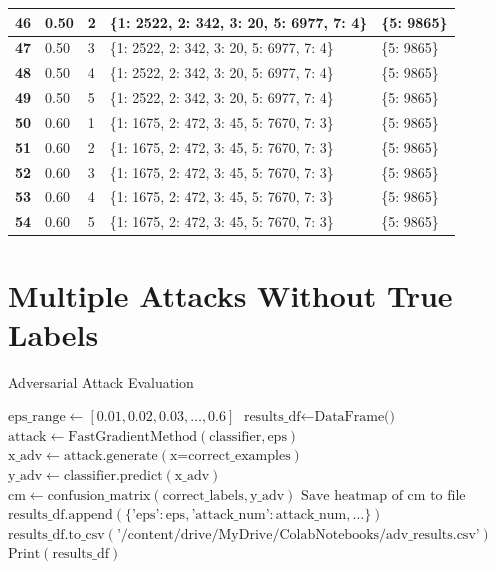 \documentclass[11pt,onside]{article}
\begin{document}
\begin{table}[]
\begin{tabular}{|l|l|l|l|l|}
\textbf{46} & 0.50         & 2            & \{1: 2522, 2: 342, 3: 20, 5: 6977, 7: 4\} & \{5: 9865\}              \\ \hline
\textbf{47} & 0.50         & 3            & \{1: 2522, 2: 342, 3: 20, 5: 6977, 7: 4\} & \{5: 9865\}              \\ \hline
\textbf{48} & 0.50         & 4            & \{1: 2522, 2: 342, 3: 20, 5: 6977, 7: 4\} & \{5: 9865\}              \\ \hline
\textbf{49} & 0.50         & 5            & \{1: 2522, 2: 342, 3: 20, 5: 6977, 7: 4\} & \{5: 9865\}              \\ \hline
\textbf{50} & 0.60         & 1            & \{1: 1675, 2: 472, 3: 45, 5: 7670, 7: 3\} & \{5: 9865\}              \\ \hline
\textbf{51} & 0.60         & 2            & \{1: 1675, 2: 472, 3: 45, 5: 7670, 7: 3\} & \{5: 9865\}              \\ \hline
\textbf{52} & 0.60         & 3            & \{1: 1675, 2: 472, 3: 45, 5: 7670, 7: 3\} & \{5: 9865\}              \\ \hline
\textbf{53} & 0.60         & 4            & \{1: 1675, 2: 472, 3: 45, 5: 7670, 7: 3\} & \{5: 9865\}              \\ \hline
\textbf{54} & 0.60         & 5            & \{1: 1675, 2: 472, 3: 45, 5: 7670, 7: 3\} & \{5: 9865\}              \\ \hline
\end{tabular}
\end{table}
\clearpage %

\section{Multiple Attacks Without True Labels}

\begin{algorithm}[H]
\caption{Adversarial Attack Evaluation}
\begin{algorithmic}[1]
\State $\text{eps\_range} \gets [0.01, 0.02, 0.03, \ldots, 0.6]$
\State $\text{results\_df} \gets \text{DataFrame()}$
        \State $\text{attack} \gets \text{FastGradientMethod}(\text{classifier}, \text{eps})$
        \State $\text{x\_adv} \gets \text{attack.generate}(\text{x=correct\_examples})$
        \State $\text{y\_adv} \gets \text{classifier.predict}(\text{x\_adv})$
        \State $\text{cm} \gets \text{confusion\_matrix}(\text{correct\_labels}, \text{y\_adv})$
        \State $\text{Save heatmap of cm to file}$
        \State $\text{results\_df.append}(\{\text{'eps'}: \text{eps}, \text{'attack\_num'}: \text{attack\_num}, \ldots\})$
    \EndFor
\EndFor
\State $\text{results\_df.to\_csv}(\text{'/content/drive/MyDrive/ColabNotebooks/adv\_results.csv'})$
\State $\text{Print}(\text{results\_df})$
\end{algorithmic}
\end{algorithm}
\end{document}
